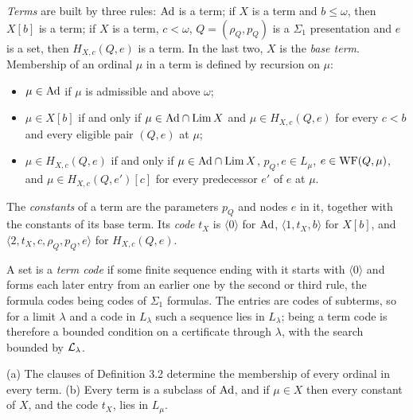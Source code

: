 \documentclass[11pt]{article}
\begin{document}
\begin{statement} \emph{Terms} are built by three rules: $\mathrm{Ad}$ is a term; if $X$ is a
term and $b \le \omega$, then $X[b]$ is a term; if $X$ is a term, $c < \omega$, $Q = (\rho_Q, p_Q)$ is a $\Sigma_1$
presentation and $e$ is a set, then $H_{X,c}(Q, e)$ is a term. In the last two, $X$ is the \emph{base term}. Membership
of an ordinal $\mu$ in a term is defined by recursion on $\mu$:
\begin{itemize}
\item $\mu \in \mathrm{Ad}$ if $\mu$ is admissible and above $\omega$;
\item $\mu \in X[b]$ if and only if $\mu \in \mathrm{Ad} \cap \mathrm{Lim}\, X$ and $\mu \in H_{X,c}(Q, e)$ for every $c < b$ and every
  eligible pair $(Q,e)$ at $\mu$;
\item $\mu \in H_{X,c}(Q, e)$ if and only if $\mu \in \mathrm{Ad} \cap \mathrm{Lim}\, X$, $p_Q, e \in L_\mu$, $e \in \mathrm{WF}(Q, \mu)$, and
  $\mu \in H_{X,c}(Q, e')[c]$ for every predecessor $e'$ of $e$ at $\mu$.
\end{itemize}
The \emph{constants} of a term are the parameters $p_Q$ and nodes $e$ in it, together with the constants of its base
term. Its \emph{code} $t_X$ is $\langle 0\rangle$ for $\mathrm{Ad}$, $\langle 1, t_X, b\rangle$ for $X[b]$, and $\langle 2, t_X,
c, \rho_Q, p_Q, e\rangle$ for $H_{X,c}(Q,e)$.
\end{statement}

A set is a \emph{term code} if some finite sequence ending with it starts with $\langle 0\rangle$ and forms each later
entry from an earlier one by the second or third rule, the formula codes being codes of $\Sigma_1$ formulas. The
entries are codes of subterms, so for a limit $\lambda$ and a code in $L_\lambda$ such a sequence lies in $L_\lambda$;
being a term code is therefore a bounded condition on a certificate through $\lambda$, with the search bounded by
$\mathcal{L}_\lambda$.

\begin{statement} (a) The clauses of Definition 3.2 determine the membership of every ordinal in every
term. (b) Every term is a subclass of $\mathrm{Ad}$, and if $\mu \in X$ then every constant of $X$, and the code $t_X$, lies
in $L_\mu$.
\end{statement}
\end{document}
